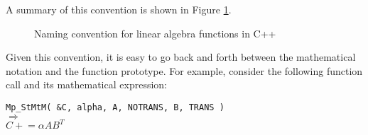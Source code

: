 \documentclass[acmtoms,acmnow]{acmtrans2m}
\begin{document}
A summary of this convention is shown in Figure
{}\ref{rsqppp:tbl:linalgpack_naming_convention}.
%
{\bsinglespace
\begin{figure}
\caption[Naming convention summary table for linear algebra functions]{
\label{rsqppp:tbl:linalgpack_naming_convention}
Naming convention for linear algebra functions in C++
}
\end{figure}
\esinglespace}
%
Given this convention, it is easy to go back and forth between the
mathematical notation and the function prototype. For example, consider the
following function call and its mathematical expression:\\[1.0ex]

{\bsinglespace
\hspace*{4ex}\parbox{\textwidth}{
{}\texttt{Mp\_StMtM( \&C, alpha, A, NOTRANS, B, TRANS )}\\
$\Longrightarrow$\\
$C +\!= \alpha A B^T$
}
\esinglespace}\\[1ex]
\end{document}
